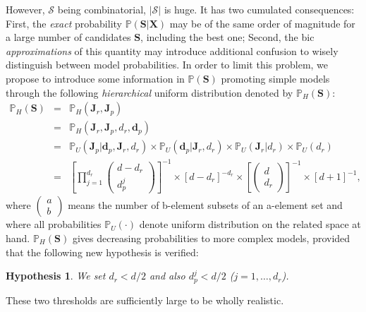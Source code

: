\documentclass[11pt,a4paper]{article}
\newtheorem{hyp}{Hypothesis}
\begin{document}
However, $\mathcal{S}$ being combinatorial, $|\mathcal{S}|$ is huge. It has two cumulated consequences: First, the {\it exact} probability $\mathbb{P}(\boldsymbol{S}|\boldsymbol{X})$ may be of the same order of magnitude for a large number of candidates  $\boldsymbol{S}$, including the best one; Second, the {\sc bic} {\it approximations} of this quantity may introduce additional confusion to wisely distinguish between model probabilities. In order to limit this problem, we propose to introduce some information in $\mathbb{P}(\boldsymbol{S})$ promoting simple models through the following {\it hierarchical} uniform distribution denoted by $\mathbb{P}_H(\boldsymbol{S})$:
\begin{eqnarray}
\mathbb{P}_H(\boldsymbol{S}) & = & \mathbb{P}_H(\boldsymbol{J}_r,\boldsymbol{J}_p) \\
 & = & \mathbb{P}_H(\boldsymbol{J}_r,\boldsymbol{J}_p,d_r,\boldsymbol{d}_p) \\
 & = & \mathbb{P}_U(\boldsymbol{J}_p|\boldsymbol{d}_p,\boldsymbol{J}_r,d_r) \times \mathbb{P}_U(\boldsymbol{d}_p|\boldsymbol{J}_r,d_r) \times \mathbb{P}_U(\boldsymbol{J}_r|d_r)\times \mathbb{P}_U(d_r) \\
 & = & \left[\prod_{j=1}^{d_r} \left(\begin{array}{c} d-d_r \\ d_p^j \end{array}\right) \right]^{-1} \times \left[d-d_r\right]^{-d_r} \times \left[\left(\begin{array}{c} d \\ d_r \end{array} \right)\right]^{-1} \times [d+1]^{-1},
\end{eqnarray}
where $\left(\begin{array}{c} a \\ b \end{array}\right)$ means the number of b-element subsets of an a-element set and where all probabilities $\mathbb{P}_U(\cdot)$ denote uniform distribution on the related space at hand. $\mathbb{P}_H(\boldsymbol{S})$ gives decreasing probabilities to more complex models, provided that the following new hypothesis is verified:

\begin{hyp}\label{H5}
We set $d_r<d/2$ and also $d_p^j<d/2$ ($j=1,\ldots,d_r$).
\end{hyp}

These two thresholds are sufficiently large to be wholly realistic.
\end{document}
